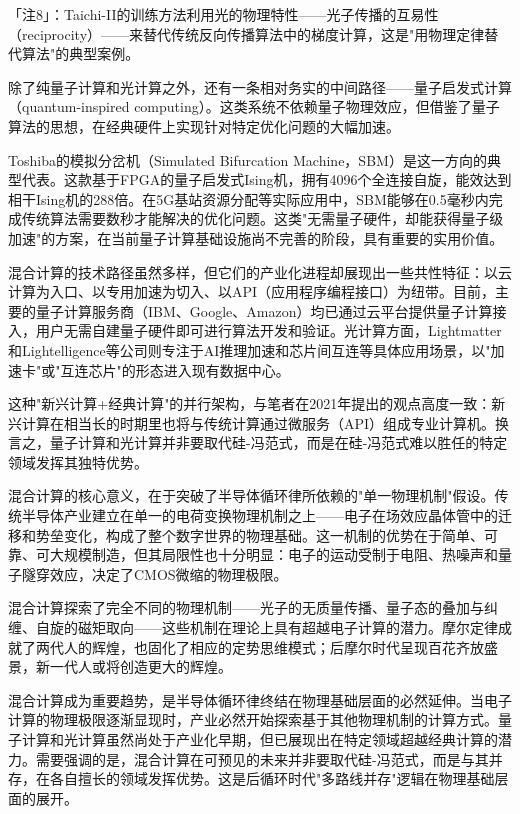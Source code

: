 \documentclass[11pt,a4paper]{article}
\begin{document}
「注8」：Taichi-II的训练方法利用光的物理特性——光子传播的互易性（reciprocity）——来替代传统反向传播算法中的梯度计算，这是"用物理定律替代算法"的典型案例。

除了纯量子计算和光计算之外，还有一条相对务实的中间路径——量子启发式计算（quantum-inspired computing）。这类系统不依赖量子物理效应，但借鉴了量子算法的思想，在经典硬件上实现针对特定优化问题的大幅加速。

Toshiba的模拟分岔机（Simulated Bifurcation Machine，SBM）是这一方向的典型代表。这款基于FPGA的量子启发式Ising机，拥有4096个全连接自旋，能效达到相干Ising机的288倍。在5G基站资源分配等实际应用中，SBM能够在0.5毫秒内完成传统算法需要数秒才能解决的优化问题。这类"无需量子硬件，却能获得量子级加速"的方案，在当前量子计算基础设施尚不完善的阶段，具有重要的实用价值。

混合计算的技术路径虽然多样，但它们的产业化进程却展现出一些共性特征：以云计算为入口、以专用加速为切入、以API（应用程序编程接口）为纽带。目前，主要的量子计算服务商（IBM、Google、Amazon）均已通过云平台提供量子计算接入，用户无需自建量子硬件即可进行算法开发和验证。光计算方面，Lightmatter和Lightelligence等公司则专注于AI推理加速和芯片间互连等具体应用场景，以"加速卡"或"互连芯片"的形态进入现有数据中心。

这种"新兴计算+经典计算"的并行架构，与笔者在2021年提出的观点高度一致：新兴计算在相当长的时期里也将与传统计算通过微服务（API）组成专业计算机。换言之，量子计算和光计算并非要取代硅-冯范式，而是在硅-冯范式难以胜任的特定领域发挥其独特优势。

混合计算的核心意义，在于突破了半导体循环律所依赖的"单一物理机制"假设。传统半导体产业建立在单一的电荷变换物理机制之上——电子在场效应晶体管中的迁移和势垒变化，构成了整个数字世界的物理基础。这一机制的优势在于简单、可靠、可大规模制造，但其局限性也十分明显：电子的运动受制于电阻、热噪声和量子隧穿效应，决定了CMOS微缩的物理极限。

混合计算探索了完全不同的物理机制——光子的无质量传播、量子态的叠加与纠缠、自旋的磁矩取向——这些机制在理论上具有超越电子计算的潜力。摩尔定律成就了两代人的辉煌，也固化了相应的定势思维模式；后摩尔时代呈现百花齐放盛景，新一代人或将创造更大的辉煌。

混合计算成为重要趋势，是半导体循环律终结在物理基础层面的必然延伸。当电子计算的物理极限逐渐显现时，产业必然开始探索基于其他物理机制的计算方式。量子计算和光计算虽然尚处于产业化早期，但已展现出在特定领域超越经典计算的潜力。需要强调的是，混合计算在可预见的未来并非要取代硅-冯范式，而是与其并存，在各自擅长的领域发挥优势。这是后循环时代"多路线并存"逻辑在物理基础层面的展开。
\end{document}
